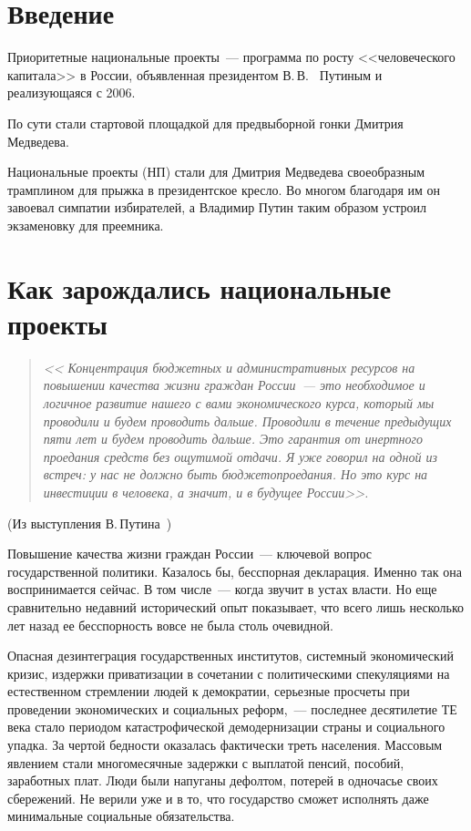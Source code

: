 \documentclass[article, 12pt, russian, oneside]{ncc}
\begin{document}
 \thispagestyle{empty}
\tableofcontents
\newpage

\section*{Введение}

Приоритетные национальные проекты~--- программа по росту
<<человеческого капитала>> в России, объявленная президентом В.\,В.~
Путиным и реализующаяся с 2006.

По сути стали стартовой площадкой для предвыборной гонки Дмитрия
Медведева.

Национальные проекты (НП) стали для Дмитрия Медведева своеобразным
трамплином для прыжка в президентское кресло. Во многом благодаря им
он завоевал симпатии избирателей, а Владимир Путин таким образом
устроил экзаменовку для преемника.
\newpage

\section{Как зарождались национальные проекты}

\begin{quote}
  \emph{<< Концентрация бюджетных и административных ресурсов на
    повышении качества жизни граждан России~--- это необходимое и
    логичное развитие нашего с вами экономического курса, который мы
    проводили и будем проводить дальше. Проводили в течение предыдущих
    пяти лет и будем проводить дальше. Это гарантия от инертного
    проедания средств без ощутимой отдачи. Я уже говорил на одной из
    встреч: у нас не должно быть бюджетопроедания. Но это курс на
    инвестиции в человека, а значит, и в будущее России>>.}
\end{quote}
\begin{flushright}
  (Из выступления В.\,Путина~\cite{Putin_RG})
\end{flushright}

Повышение качества жизни граждан России~--- ключевой вопрос
государственной политики. Казалось бы, бесспорная декларация. Именно
так она воспринимается сейчас. В том числе~--- когда звучит в устах
власти. Но еще сравнительно недавний исторический опыт показывает, что
всего лишь несколько лет назад ее бесспорность вовсе не была столь
очевидной.

Опасная дезинтеграция государственных институтов, системный
экономический кризис, издержки приватизации в сочетании с
политическими спекуляциями на естественном стремлении людей к
демократии, серьезные просчеты при проведении экономических и
социальных реформ,~--- последнее десятилетие ТЕ века стало периодом
катастрофической демодернизации страны и социального упадка. За чертой
бедности оказалась фактически треть населения. Массовым явлением стали
многомесячные задержки с выплатой пенсий, пособий, заработных
плат. Люди были напуганы дефолтом, потерей в одночасье своих
сбережений. Не верили уже и в то, что государство сможет исполнять
даже минимальные социальные обязательства.
\end{document}
